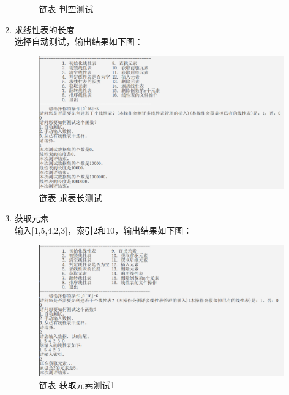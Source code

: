 \documentclass[supercite]{Experimental_Report}
\theoremstyle{definition}
\begin{document}
\begin{enumerate}
\begin{figure}[htb]
\begin{center}
				\caption{链表-判空测试}
				\label{fig1-6}
			\end{center}
		\end{figure}
		\item 求线性表的长度\\
		选择自动测试，输出结果如下图：
		\begin{figure}[htb]
			\begin{center}
				\includegraphics[scale=0.60]{images/链表-求表长.png}
				\caption{链表-求表长测试}
				\label{fig1-7}
			\end{center}
		\end{figure}
		\newpage
		\item 获取元素\\
		输入[1,5,4,2,3]，索引2和10，输出结果如下图：
		\begin{figure}[htb]
			\begin{center}
				\includegraphics[scale=0.60]{images/链表-获取元素.png}
				\caption{链表-获取元素测试1}
				\label{fig1-8.1}
			\end{center}
		\end{figure}
		\begin{figure}[htb]
			\begin{center}

\end{center}
\end{figure}
\end{enumerate}
\end{document}
